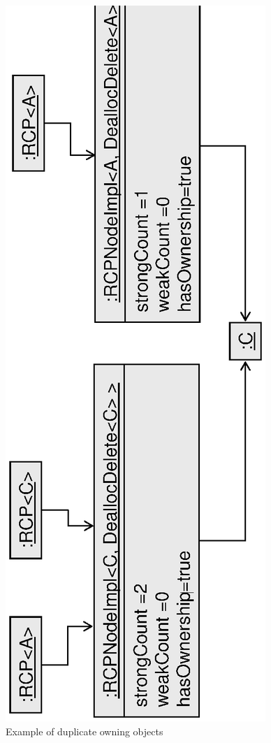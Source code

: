 \documentclass[pdf,ps2pdf,11pt]{SANDreport}
\begin{document}
{\begin{figure}
\begin{center}
\includegraphics*[angle=270,scale=0.65]{RCPEx2}
\end{center}
\caption{
\label{fig:RCPEx2}
Example of duplicate owning {} objects}
\end{figure}
\esinglespace}
\end{document}

